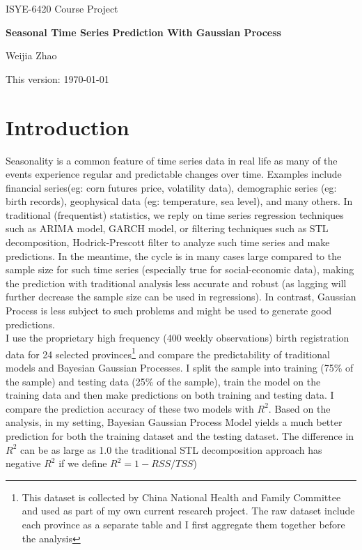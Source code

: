 \documentclass[letterpaper,12pt]{article}
\begin{document}
\begin{center}
\large ISYE-6420 Course Project

\bigskip
\textbf{\large Seasonal Time Series Prediction With Gaussian Process}
\bigskip


Weijia Zhao

\bigskip
This version: \today
\end{center}



\section{Introduction}
\quad Seasonality is a common feature of time series data in real life as many of the events experience regular and predictable changes over time. Examples include financial series(eg: corn futures price, volatility data), demographic series (eg: birth records), geophysical data (eg: temperature, sea level), and many others.  In traditional (frequentist) statistics, we reply on time series regression techniques such as ARIMA model, GARCH model, or filtering techniques such as STL decomposition, Hodrick-Prescott filter to analyze such time series and make predictions. In the meantime, the cycle is in many cases large compared to the sample size for such time series (especially true for social-economic data), making the prediction with traditional analysis less accurate and robust (as lagging will further decrease the sample size can be used in regressions). In contrast, Gaussian Process is less subject to such problems and might be used to generate good predictions.\\

I use the proprietary high frequency (400 weekly observations) birth registration data for 24 selected provinces\footnote{This dataset is collected by  China National Health and Family Committee and used as part of my own current research project. The raw dataset include each province as a separate table and I first aggregate them together before the analysis} and compare the predictability of traditional models and Bayesian Gaussian Processes. I split the sample into training (75\% of the sample) and testing data (25\% of the sample), train the model on the training data and then make predictions on both training and testing data. I compare the prediction accuracy of these two models with $R^2$. Based on the analysis, in my setting, Bayesian Gaussian Process Model yields a much better prediction for both the training dataset and the testing dataset. The difference in $R^2$ can be as large as 1.0 the traditional STL decomposition approach has negative $R^2$ if we define $R^2=1-RSS/TSS$)
\end{document}
